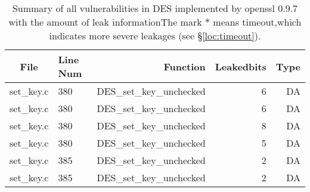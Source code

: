 \begin{table}%
\centering\tiny
\caption{Summary of all vulnerabilities in DES implemented by openssl 0.9.7 with the amount of leak informationThe mark $*$ means timeout,which indicates more severe leakages (see \S\ref{loc:timeout}).}\label{tab:DESopenssl}
\begin{tabular}{clrrr}
\hline
\textbf{File} & \textbf{Line Num} & \textbf{Function} & \textbf{Leakedbits} & \textbf{Type} \\\hline
set\_key.c& 380&DES\_set\_key\_unchecked&6 &DA\\
set\_key.c& 380&DES\_set\_key\_unchecked&6 &DA\\
set\_key.c& 380&DES\_set\_key\_unchecked&8 &DA\\
set\_key.c& 380&DES\_set\_key\_unchecked&5 &DA\\
set\_key.c& 385&DES\_set\_key\_unchecked&2 &DA\\
set\_key.c& 385&DES\_set\_key\_unchecked&2 &DA\\
\hline
\end{tabular}
\end{table}